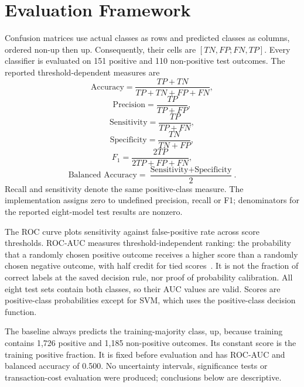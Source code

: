 \documentclass[letterpaper,10pt,conference]{ieeeconf}
\begin{document}
\section{Evaluation Framework}
Confusion matrices use actual classes as rows and predicted classes as columns, ordered non-up then up. Consequently, their cells are $[TN,FP;FN,TP]$. Every classifier is evaluated on 151 positive and 110 non-positive test outcomes. The reported threshold-dependent measures are
\begin{equation}\text{Accuracy}=\frac{TP+TN}{TP+TN+FP+FN},\end{equation}
\begin{equation}\text{Precision}=\frac{TP}{TP+FP},\end{equation}
\begin{equation}\text{Sensitivity}=\frac{TP}{TP+FN},\end{equation}
\begin{equation}\text{Specificity}=\frac{TN}{TN+FP},\end{equation}
\begin{equation}F_1=\frac{2TP}{2TP+FP+FN},\end{equation}
\begin{equation}\text{Balanced Accuracy}=\frac{\text{Sensitivity}+\text{Specificity}}{2}.\end{equation}
Recall and sensitivity denote the same positive-class measure. The implementation assigns zero to undefined precision, recall or F1; denominators for the reported eight-model test results are nonzero.

The ROC curve plots sensitivity against false-positive rate across score thresholds. ROC-AUC measures threshold-independent ranking: the probability that a randomly chosen positive outcome receives a higher score than a randomly chosen negative outcome, with half credit for tied scores~\cite{fawcett2006}. It is not the fraction of correct labels at the saved decision rule, nor proof of probability calibration. All eight test sets contain both classes, so their AUC values are valid. Scores are positive-class probabilities except for SVM, which uses the positive-class decision function.

The baseline always predicts the training-majority class, up, because training contains 1,726 positive and 1,185 non-positive outcomes. Its constant score is the training positive fraction. It is fixed before evaluation and has ROC-AUC and balanced accuracy of 0.500. No uncertainty intervals, significance tests or transaction-cost evaluation were produced; conclusions below are descriptive.
\end{document}
